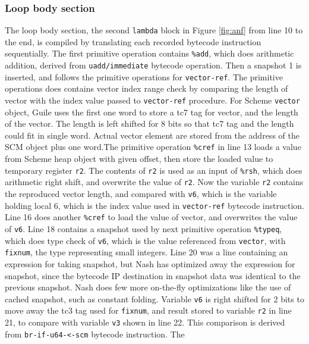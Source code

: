 \documentclass[preprint]{sigplanconf}
\begin{document}
\subsubsection{Loop body section}

The loop body section, the second \texttt{lambda} block in Figure
\hyperref[fig:anf]{\ref{fig:anf}} from line 10 to the end, is compiled by
translating each recorded bytecode instruction sequentially. The first
primitive operation contains \texttt{\%add}, which does arithmetic addition,
derived from \texttt{uadd/immediate} bytecode operation. Then a snapshot 1 is
inserted, and follows the primitive operations for \texttt{vector-ref}. The
primitive operations does contains vector index range check by comparing the
length of vector with the index value passed to \texttt{vector-ref}
procedure. For Scheme \texttt{vector} object, Guile uses the first one word to
store a tc7 tag for vector, and the length of the vector. The length is left
shifted for 8 bits so that tc7 tag and the length could fit in single
word. Actual vector element are stored from the address of the SCM object plus
one word.\@ The primitive operation \texttt{\%cref} in line 13 loads a value
from Scheme heap object with given offset, then store the loaded value to
temporary register \texttt{r2}. The contents of \texttt{r2} is used as an
input of \texttt{\%rsh}, which does arithmetic right shift, and overwrite the
value of \texttt{r2}. Now the variable \texttt{r2} contains the reproduced
vector length, and compared with \texttt{v6}, which is the variable holding
local 6, which is the index value used in \texttt{vector-ref} bytecode
instruction. Line 16 does another \texttt{\%cref} to load the value of vector,
and overwrites the value of \texttt{v6}. Line 18 contains a snapshot used by
next primitive operation \texttt{\%typeq}, which does type check of
\texttt{v6}, which is the value referenced from \texttt{vector}, with
\texttt{fixnum}, the type representing small integers. Line 20 was a line
containing an expression for taking snapshot, but Nash has optimized away the
expression for snapshot, since the bytecode IP destination in snapshot data
was identical to the previous snapshot. Nash does few more on-the-fly
optimizations like the use of cached snapshot, such as constant
folding. Variable \texttt{v6} is right shifted for 2 bits to move away the tc3
tag used for \texttt{fixnum}, and result stored to variable \texttt{r2} in
line 21, to compare with variable \texttt{v3} shown in line 22. This
comparison is derived from \texttt{br-if-u64-<-scm} bytecode instruction. The
\end{document}
